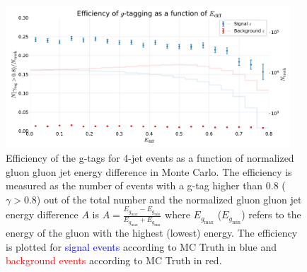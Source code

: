 \begin{figure}
  \includegraphics[width=0.95\textwidth, trim=0 0 0 40, clip, page=1]{figures/quarks/efficiency_events-down_sample=1.00-ML_vars=vertex-selection=b-ejet_min=4-n_iter_RS_lgb=99-n_iter_RS_xgb=9-cdot_cut=0.90-version=19-njet=4.pdf}
  \caption[g-Tagging efficiency for 4-jet events in MC as a function of normalized gluon gluon jet energy difference]
          {Efficiency of the g-tags for 4-jet events as a function of normalized gluon gluon jet energy difference in Monte Carlo. The efficiency is measured as the number of events with a g-tag higher than 0.8 ($\gamma > 0.8$) out of the total number and the normalized gluon gluon jet energy difference $A$ is $A=\frac{E_{g_\mathrm{max}}-E_{g_\mathrm{min}}}{E_{g_\mathrm{max}}+E_{g_\mathrm{min}}}$ where $E_{g_\mathrm{max}}$ ($E_{g_\mathrm{min}}$) refers to the energy of the gluon with the highest (lowest) energy. The efficiency is plotted for \textcolor{blue}{signal events} according to MC Truth in blue and \textcolor{red}{background events} according to MC Truth in red.
          } 
  \label{fig:q:effiency_gtag_E_diff}
\end{figure}


